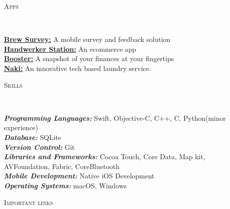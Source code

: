 \documentclass[9pt]{article}
\newenvironment{changemargin}[2]{%
  \begin{list}{}{%
    \setlength{\topsep}{0pt}%
    \setlength{\leftmargin}{#1}%
    \setlength{\rightmargin}{#2}%
    \setlength{\listparindent}{\parindent}%
    \setlength{\itemindent}{\parindent}%
    \setlength{\parsep}{\parskip}%
  }%
  \item[]}{\end{list}
}
\newcommand{\lineover}{
    \begin{changemargin}{-0.05in}{-0.05in}
        \vspace*{-8pt}
        \hrulefill \\
        \vspace*{-2pt}
    \end{changemargin}
}
\newcommand{\header}[1]{
    \begin{changemargin}{-0.5in}{-0.5in}
        \scshape{#1}\\
    \lineover
    \end{changemargin}
}
\newenvironment{body} {
    \vspace*{-16pt}
    \begin{changemargin}{-0.25in}{-0.5in}
  }
    {\end{changemargin}
}
\begin{document}
\smallskip


\header{Apps}

\begin{body}
    \vspace{14pt}
    \href{https://itunes.apple.com/us/app/brew-survey-offline-feedback/id1207197946?mt=8 }{\textbf{Brew Survey:}}{} A mobile survey and feedback solution \\
    \href{https://itunes.apple.com/us/app/handwerkerstation/id1247972146?mt=8 }{\textbf{Handwerker Station:}}{} An ecommerce app \\
    \href{https://itunes.apple.com/nz/app/booster-nz/id1179170506?mt=8}{\textbf{Booster:}}{} A snapshot of your finances at your fingertips \\
    \href{https://itunes.apple.com/in/app/naki-laundry/id621934237?mt=8}{\textbf{Naki:}}{} An innovative tech based laundry service. \\
\end{body}

\smallskip


\header{Skills}

\begin{body}
    \vspace{14pt}
    \emph{\textbf{Programming Languages:}}{} Swift, Objective-C, C++, C, Python(minor experience)\\
    \emph{\textbf{Database:}}{} SQLite\\
    \emph{\textbf{Version Control:}}{} Git\\
    \emph{\textbf{Libraries and Frameworks:}}{} Cocoa Touch, Core Data, Map kit, AVFoundation,
Fabric, CoreBluetooth \\
    \emph{\textbf{Mobile Development:}}{} Native iOS Development \\
    \emph{\textbf{Operating Systems:}}{} macOS, Windows\\
\end{body}

\smallskip


\header{Important links}
\end{document}
